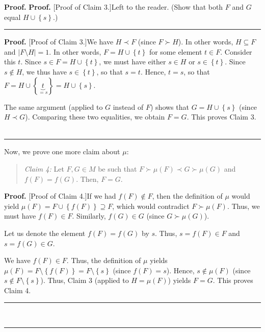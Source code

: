 \documentclass[numbers=enddot,12pt,final,onecolumn,notitlepage]{scrartcl}%
\theoremstyle{definition}
\newenvironment{statement}{\begin{quote}}{\end{quote}}
\newenvironment{proof}[1][Proof]{\noindent\textbf{#1.} }{\ \rule{0.5em}{0.5em}}
\newenvironment{verlong}{}{}
\newenvironment{vershort}{}{}
\begin{document}
\begin{proof}
\begin{vershort}
\begin{proof}
[Proof of Claim 3.]Left to the reader. (Show that both $F$ and $G$ equal
$H\cup\left\{  s\right\}  $.)
\end{proof}
\end{vershort}

\begin{verlong}


\begin{proof}
[Proof of Claim 3.]We have $H\prec F$ (since $F\succ H$). In other words,
$H\subseteq F$ and $\left\vert F\setminus H\right\vert =1$. In other words,
$F=H\cup\left\{  t\right\}  $ for some element $t\in F$. Consider this $t$.
Since $s\in F=H\cup\left\{  t\right\}  $, we must have either $s\in H$ or
$s\in\left\{  t\right\}  $. Since $s\notin H$, we thus have $s\in\left\{
t\right\}  $, so that $s=t$. Hence, $t=s$, so that $F=H\cup\left\{
\underbrace{t}_{=s}\right\}  =H\cup\left\{  s\right\}  $.

The same argument (applied to $G$ instead of $F$) shows that $G=H\cup\left\{
s\right\}  $ (since $H\prec G$). Comparing these two equalities, we obtain
$F=G$. This proves Claim 3.
\end{proof}
\end{verlong}

Now, we prove one more claim about $\mu$:

\begin{statement}
\textit{Claim 4:} Let $F,G\in M$ be such that $F\succ\mu\left(  F\right)
\prec G\succ\mu\left(  G\right)  $ and $f\left(  F\right)  =f\left(  G\right)
$. Then, $F=G$.
\end{statement}

\begin{proof}
[Proof of Claim 4.]If we had $f\left(  F\right)  \notin F$, then the
definition of $\mu$ would yield $\mu\left(  F\right)  =F\cup\left\{  f\left(
F\right)  \right\}  \supseteq F$, which would contradict $F\succ\mu\left(
F\right)  $. Thus, we must have $f\left(  F\right)  \in F$. Similarly,
$f\left(  G\right)  \in G$ (since $G\succ\mu\left(  G\right)  $).

Let us denote the element $f\left(  F\right)  =f\left(  G\right)  $ by $s$.
Thus, $s=f\left(  F\right)  \in F$ and $s=f\left(  G\right)  \in G$.

We have $f\left(  F\right)  \in F$. Thus, the definition of $\mu$ yields
$\mu\left(  F\right)  =F\setminus\left\{  f\left(  F\right)  \right\}
=F\setminus\left\{  s\right\}  $ (since $f\left(  F\right)  =s$). Hence,
$s\notin\mu\left(  F\right)  $ (since $s\notin F\setminus\left\{  s\right\}
$). Thus, Claim 3 (applied to $H=\mu\left(  F\right)  $) yields $F=G$. This
proves Claim 4.
\end{proof}


\end{proof}
\end{document}
